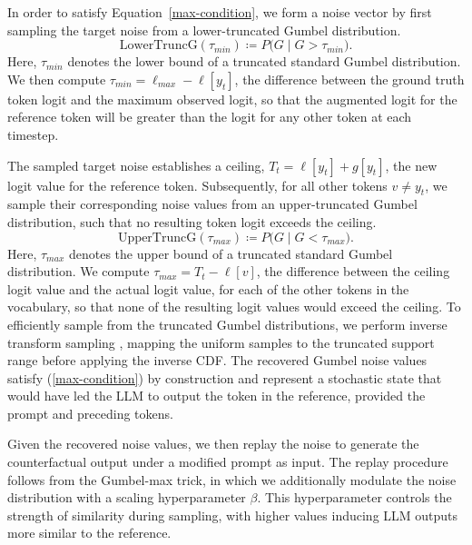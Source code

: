 \documentclass[11pt]{article}
\begin{document}
In order to satisfy Equation~\ref{max-condition}, we form a noise vector by first sampling the target noise from a lower-truncated Gumbel distribution. 
$$
\mathrm{LowerTruncG}(\tau_{min}) \coloneqq P\bigl(G \mid G > \tau_{min}\bigr).
$$ 
Here, $\tau_{min}$ denotes the lower bound of a truncated standard Gumbel distribution. We then compute $\tau_{min} = \ell_{max} - \ell[{y_t}]$, the difference between the ground truth token logit and the maximum observed logit, so that the augmented logit for the reference token will be greater than the logit for any other token at each timestep.

% 


The sampled target noise establishes a ceiling, $T_{t} = \ell[{y_t}] + g[y_t]$, the new logit value for the reference token. Subsequently, for all other tokens $v \neq y_t$, we sample their corresponding noise values from an upper-truncated Gumbel distribution, such that no resulting token logit exceeds the ceiling. 
$$
\mathrm{UpperTruncG}(\tau_{max}) \coloneqq P\bigl(G \mid G < \tau_{max}\bigr).
$$ 
Here, $\tau_{max}$ denotes the upper bound of a truncated standard Gumbel distribution. We compute $\tau_{max} = T_t - \ell[v]$, the difference between the ceiling logit value and the actual logit value, for each of the other tokens in the vocabulary, so that none of the resulting logit values would exceed the ceiling. To efficiently sample from the truncated Gumbel distributions, we perform inverse transform sampling \cite{devroye1986non}, mapping the uniform samples to the truncated support range before applying the inverse CDF. The recovered Gumbel noise values satisfy (\ref{max-condition}) by construction and represent a stochastic state that would have led the LLM to output the token in the reference, provided the prompt and preceding tokens.

Given the recovered noise values, we then replay the noise to generate the counterfactual output under a modified prompt as input. The replay procedure follows from the Gumbel-max trick, in which we additionally modulate the noise distribution with a scaling hyperparameter $\beta$. This hyperparameter controls the strength of similarity during sampling, with higher values inducing LLM outputs more similar to the reference. 
\end{document}
